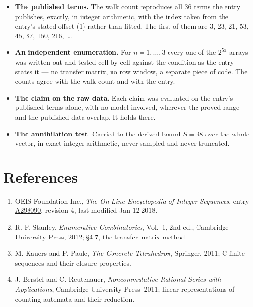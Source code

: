 \documentclass[11pt]{article}
\theoremstyle{definition}
\begin{document}
\begin{itemize}

\item {\bfseries The published terms.} The walk count reproduces all 36 terms the entry publishes, exactly, in integer arithmetic, with the index taken from the entry's stated offset (1) rather than fitted. The first of them are 3, 23, 21, 53, 45, 87, 150, 216,~\dots

\item {\bfseries An independent enumeration.} For $n = 1,\dots,3$ every one of the $2^{5n}$ arrays was written out and tested cell by cell against the condition as the entry states it --- no transfer matrix, no row window, a separate piece of code. The counts agree with the walk count and with the entry.

\item {\bfseries The claim on the raw data.} Each claim was evaluated on the entry's published terms alone, with no model involved, wherever the proved range and the published data overlap. It holds there.

\item {\bfseries The annihilation test.} Carried to the derived bound $S = 98$ over the whole vector, in exact integer arithmetic, never sampled and never truncated.

\end{itemize}

\section{References}

\begin{enumerate}

\item OEIS Foundation Inc., \emph{The On-Line Encyclopedia of Integer Sequences}, entry \href{https://oeis.org/A298090}{A298090}, revision 4, last modified Jan 12 2018.

\item R. P. Stanley, \emph{Enumerative Combinatorics}, Vol.~1, 2nd ed., Cambridge University Press, 2012; \S4.7, the transfer-matrix method.

\item M. Kauers and P. Paule, \emph{The Concrete Tetrahedron}, Springer, 2011; C-finite sequences and their closure properties.

\item J. Berstel and C. Reutenauer, \emph{Noncommutative Rational Series with Applications}, Cambridge University Press, 2011; linear representations of counting automata and their reduction.

\end{enumerate}
\end{document}

